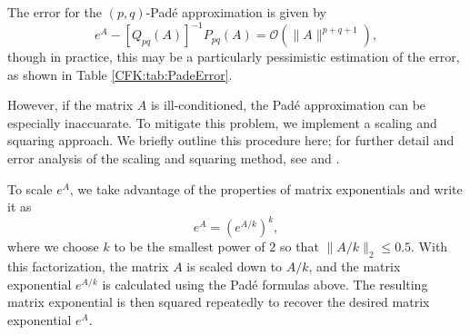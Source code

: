 \documentclass{csri19}
\begin{document}
The error for the $(p,q)$-Pad\'e approximation is given by
\[ e^A - \left[Q_{pq}(A)\right]^{-1}P_{pq}(A) = \mathcal{O}(\|A\|^{p+q+1}),\]
though in practice, this may be a particularly pessimistic estimation of 
the error, as shown in Table \ref{CFK:tab:PadeError}.

However, if the matrix $A$ is ill-conditioned, the Pad\'e  approximation 
can be especially inaccuarate. To mitigate this problem, we implement a 
scaling and squaring approach. We briefly outline this procedure here; for 
further detail and error analysis of the scaling and squaring method, see 
\cite{CFK:higham2005} and \cite{CFK:Al-Mohy2009}. 

To scale $e^A$, we take advantage of the properties of matrix exponentials 
and write it as
\[e^{A} = \left(e^{A/k}\right)^k,\]
where we choose $k$ to be the smallest power of $2$ so that 
$\|A/k\|_2 \leq 0.5$. With this factorization, the matrix $A$ is scaled down
 to $A/k$, and the matrix exponential $e^{A/k}$ is calculated using the 
Pad\'e formulas above. The resulting matrix exponential is then squared 
repeatedly to recover the desired matrix exponential $e^{A}$.
\end{document}
